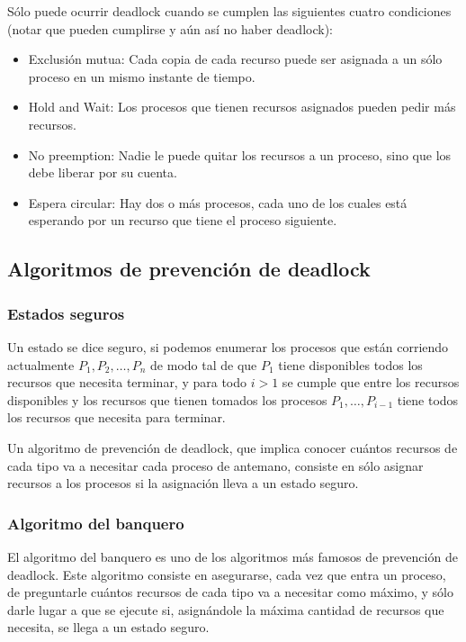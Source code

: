 \documentclass{article}
\begin{document}
S\'olo puede ocurrir deadlock cuando se cumplen las siguientes cuatro condiciones (notar que pueden cumplirse y a\'un as\'i no haber deadlock):

\begin{itemize}
\item Exclusi\'on mutua: Cada copia de cada recurso puede ser asignada a un s\'olo proceso en un mismo instante de tiempo.
\item Hold and Wait: Los procesos que tienen recursos asignados pueden pedir m\'as recursos.
\item No preemption: Nadie le puede quitar los recursos a un proceso, sino que los debe liberar por su cuenta.
\item Espera circular: Hay dos o m\'as procesos, cada uno de los cuales est\'a esperando por un recurso que tiene el proceso siguiente.
\end{itemize}

\subsection{Algoritmos de prevenci\'on de deadlock}

\subsubsection{Estados seguros}

Un estado se dice seguro, si podemos enumerar los procesos que est\'an corriendo actualmente $P_1,P_2,\dots,P_n$ de modo tal de que $P_1$ tiene disponibles todos los recursos que necesita terminar, y para todo $i > 1$ se cumple que entre los recursos disponibles y los recursos que tienen tomados los procesos $P_1,\dots,P_{i-1}$ tiene todos los recursos que necesita para terminar.

Un algoritmo de prevenci\'on de deadlock, que implica conocer cu\'antos recursos de cada tipo va a necesitar cada proceso de antemano, consiste en s\'olo asignar recursos a los procesos si la asignaci\'on lleva a un estado seguro.

\subsubsection{Algoritmo del banquero}

El algoritmo del banquero es uno de los algoritmos m\'as famosos de prevenci\'on de deadlock. Este algoritmo consiste en asegurarse, cada vez que entra un proceso, de preguntarle cu\'antos recursos de cada tipo va a necesitar como m\'aximo, y s\'olo darle lugar a que se ejecute si, asign\'andole la m\'axima cantidad de recursos que necesita, se llega a un estado seguro.
\end{document}

